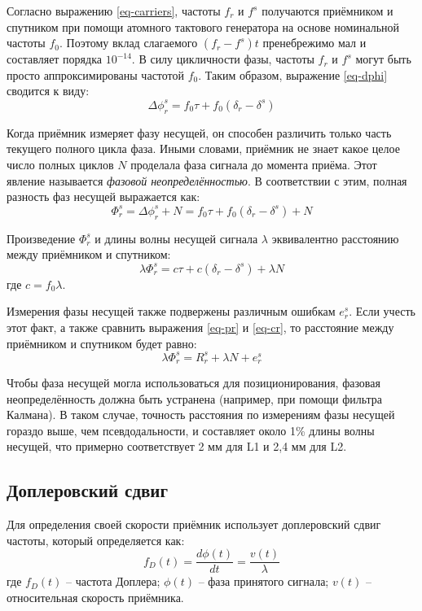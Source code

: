 Согласно выражению \eqref{eq-carriers}, частоты $f_r$ и $f^s$ получаются приёмником и спутником при помощи атомного тактового генератора на основе номинальной частоты $f_0$.
Поэтому вклад слагаемого $(f_r-f^s)t$ пренебрежимо мал и составляет порядка $10^{-14}$.  
В силу цикличности фазы, частоты $f_r$ и $f^s$ могут быть просто аппроксимированы частотой $f_0$.
Таким образом, выражение \eqref{eq-dphi} сводится к виду:
\begin{equation}
\Delta \phi_r^s=f_0\tau+f_0(\delta_r-\delta^s)    
\end{equation}

Когда приёмник измеряет фазу несущей, он способен различить только часть текущего полного цикла фаза.
Иными словами, приёмник не знает какое целое число полных циклов $N$ проделала фаза сигнала до момента приёма.
Этот явление называется \textit{фазовой неопределённостью}.
В соответствии с этим, полная разность фаз несущей выражается как:
\begin{equation}
\Phi_r^s=\Delta \phi_r^s+N=f_0\tau+f_0(\delta_r-\delta^s)+N    
\end{equation}

Произведение $\Phi_r^s$ и длины волны несущей сигнала $\lambda$ эквивалентно расстоянию между приёмником и спутником:
\begin{equation}
\label{eq-cr}
\lambda\Phi_r^s=c\tau+c(\delta_r-\delta^s)+\lambda N    
\end{equation}
где
$c=f_0\lambda$.

Измерения фазы несущей также подвержены различным ошибкам $e_r^s$.
Если учесть этот факт, а также сравнить выражения \eqref{eq-pr} и \eqref{eq-cr}, то расстояние между приёмником и спутником будет равно:
\begin{equation}
\label{eq-cr2}
\lambda\Phi_r^s=R_r^s+\lambda N+e_r^s
\end{equation}

Чтобы фаза несущей могла использоваться для позиционирования, фазовая неопределённость должна быть устранена (например, при помощи фильтра Калмана).
В таком случае, точность расстояния по измерениям фазы несущей гораздо выше, чем псевдодальности, и составляет около 1\% длины волны несущей, что примерно соответствует 2 мм для L1 и 2,4 мм для L2.

\subsection*{\textbf{Доплеровский сдвиг}}

Для определения своей скорости приёмник использует доплеровский сдвиг частоты, который определяется как:
\begin{equation}
\label{eq-dopler}
f_D(t)=\frac{d\phi(t)}{dt}=\frac{v(t)}{\lambda}    
\end{equation} 
где 
$f_D(t)$ -- частота Доплера;
$\phi(t)$ -- фаза принятого сигнала;
$v(t)$ -- относительная скорость приёмника.

